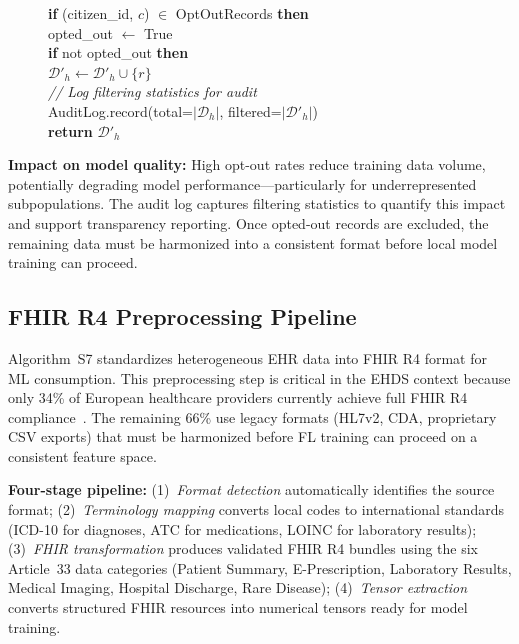 \documentclass[conference,a4paper]{IEEEtran}
\begin{document}
\begin{figure}[htbp]
{{\hspace*{8mm}\textbf{if} (citizen\_id, $c$) $\in$ OptOutRecords \textbf{then}\\
\hspace*{12mm}opted\_out $\leftarrow$ True\\
\hspace*{4mm}\textbf{if} not opted\_out \textbf{then}\\
\hspace*{8mm}$\mathcal{D}'_h \leftarrow \mathcal{D}'_h \cup \{r\}$\\[2pt]
\textit{// Log filtering statistics for audit}\\
AuditLog.record(total=$|\mathcal{D}_h|$, filtered=$|\mathcal{D}'_h|$)\\
\textbf{return} $\mathcal{D}'_h$
}}
\end{figure}

\textbf{Impact on model quality:} High opt-out rates reduce training data volume, potentially degrading model performance---particularly for underrepresented subpopulations. The audit log captures filtering statistics to quantify this impact and support transparency reporting. Once opted-out records are excluded, the remaining data must be harmonized into a consistent format before local model training can proceed.

\subsection{FHIR R4 Preprocessing Pipeline}

Algorithm~S7 standardizes heterogeneous EHR data into FHIR R4 format for ML consumption. This preprocessing step is critical in the EHDS context because only 34\% of European healthcare providers currently achieve full FHIR R4 compliance~\cite{hussein2025interop}. The remaining 66\% use legacy formats (HL7v2, CDA, proprietary CSV exports) that must be harmonized before FL training can proceed on a consistent feature space.

\textbf{Four-stage pipeline:} (1)~\textit{Format detection} automatically identifies the source format; (2)~\textit{Terminology mapping} converts local codes to international standards (ICD-10 for diagnoses, ATC for medications, LOINC for laboratory results); (3)~\textit{FHIR transformation} produces validated FHIR R4 bundles using the six Article~33 data categories (Patient Summary, E-Prescription, Laboratory Results, Medical Imaging, Hospital Discharge, Rare Disease); (4)~\textit{Tensor extraction} converts structured FHIR resources into numerical tensors ready for model training.
\end{document}
